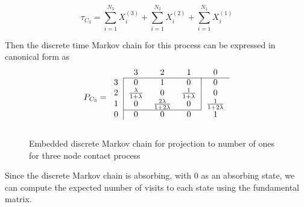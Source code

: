 \documentclass{article}
\theoremstyle{plain}
\theoremstyle{definition}
\theoremstyle{remark}
\numberwithin{equation}{section}
\begin{document}
\begin{equation}
    \tau_{C_3} = \sum_{i = 1}^{N_3} X_i^{(3)} + \sum_{i = 1}^{N_2} X_i^{(2)} + \sum_{i = 1}^{N_1} X_i^{(1)}
\end{equation}

Then the discrete time Markov chain for this process can be expressed in canonical form as
$$
P_{C_3} = \begin{blockarray}{ccccc}
    & 3 & 2 & 1 & 0\\
    \begin{block}{c|ccc|c}
    \cline{2-5}
        3 & 0 & 1 & 0 & 0 \\
        2 & \frac{\lambda}{1 + \lambda} & 0 &
        \frac{1}{1 + \lambda} & 0\\
        1 & 0 & \frac{2\lambda}{1 + 2 \lambda} & 0 & \frac{1}{1 + 2\lambda}\\
    \cline{2-4}
    \end{block}
    \begin{block}{c|cccc}
    0 & 0 & 0 & 0 & 1\\
    \end{block}
\end{blockarray}
$$

\begin{figure}[H]
    \centering
    \caption{Embedded discrete Markov chain for projection to number of ones for three node contact process}
    \label{fig:discrete_mc_three_contact}
\end{figure}

Since the discrete Markov chain is absorbing, with 0 as an absorbing state, we can compute the expected number of visits to each state using the fundamental matrix.

\end{document}
